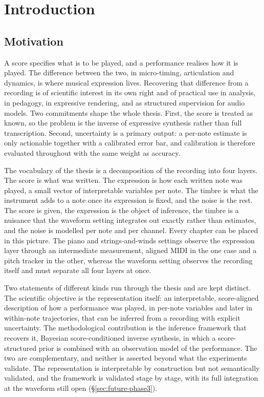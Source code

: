 \chapter{Introduction}\label{ch:intro}

\section{Motivation}
A score specifies what is to be played, and a performance realises how it is
played. The difference between the two, in micro-timing, articulation and
dynamics, is where musical expression lives. Recovering that difference from
a recording is of scientific interest in its own right and of practical use
in analysis, in pedagogy, in expressive rendering, and as structured
supervision for audio models. Two commitments shape the whole thesis. First,
the score is treated as known, so the problem is the inverse of expressive
synthesis rather than full transcription. Second, uncertainty is a primary
output: a per-note estimate is only actionable together with a calibrated
error bar, and calibration is therefore evaluated throughout with the same
weight as accuracy.

The vocabulary of the thesis is a decomposition of the recording into four
layers. The score is what was written. The expression is how each written
note was played, a small vector of interpretable variables per note. The
timbre is what the instrument adds to a note once its expression is fixed,
and the noise is the rest. The score is given, the expression is the object
of inference, the timbre is a nuisance that the waveform setting integrates
out exactly rather than estimates, and the noise is modelled per note and
per channel. Every chapter can be placed in this picture. The piano and
strings-and-winds settings observe the expression layer through an
intermediate measurement, aligned MIDI in the one case and a pitch tracker
in the other, whereas the waveform setting observes the recording itself and
must separate all four layers at once.

Two statements of different kinds run through the thesis and are kept
distinct. The scientific objective is the representation itself: an
interpretable, score-aligned description of how a performance was played,
in per-note variables and later in within-note trajectories, that can be
inferred from a recording with explicit uncertainty. The methodological
contribution is the inference framework that recovers it, Bayesian
score-conditioned inverse synthesis, in which a score-structured prior is
combined with an observation model of the performance. The two are
complementary, and neither is asserted beyond what the experiments
validate. The representation is interpretable by construction but not
semantically validated, and the framework is validated stage by stage,
with its full integration at the waveform still open
(\S\ref{sec:future-phase3}).

